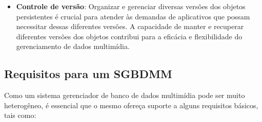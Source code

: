 \documentclass[12pt]{article}
\begin{document}
\begin{itemize}
		\item \textbf{Controle de versão}: Organizar e gerenciar diversas versões dos objetos persistentes é crucial para atender às demandas de aplicativos que possam necessitar dessas diferentes versões.  A capacidade de manter e recuperar diferentes versões dos objetos contribui para a eficácia e flexibilidade do gerenciamento de dados multimídia.
		
	\end{itemize}
	
	\subsection{Requisitos para um SGBDMM}
	
	Como um sistema gerenciador de banco de dados multimídia pode ser muito heterogêneo, é essencial que o mesmo ofereça suporte a alguns requisitos básicos, tais como:
	
\end{document}
